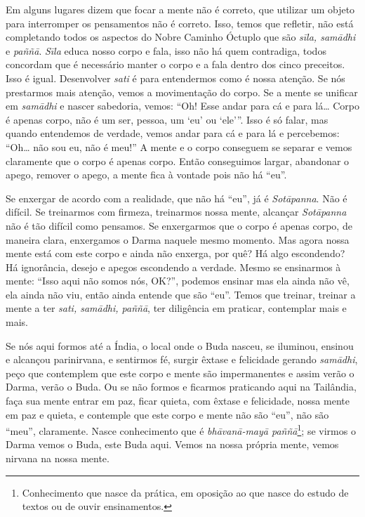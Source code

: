 Em alguns lugares dizem que focar a mente não é correto, que
utilizar um objeto para interromper os pensamentos não é correto. Isso,
temos que refletir, não está completando todos os aspectos do Nobre
Caminho Óctuplo que são \textit{sīla, samādhi} e\textit{ paññā}.
\textit{Sīla} educa nosso corpo e fala, isso não há quem contradiga,
todos concordam que é necessário manter o corpo e a fala dentro dos
cinco preceitos. Isso é igual. Desenvolver \textit{sati} é para
entendermos como é nossa atenção. Se nós prestarmos mais atenção, vemos
a movimentação do corpo. Se a mente se unificar em \textit{samādhi} e
nascer sabedoria, vemos: “Oh! Esse andar para cá e para lá… Corpo é
apenas corpo, não é um ser, pessoa, um ‘eu’ ou ‘ele’”. Isso é só falar,
mas quando entendemos de verdade, vemos andar para cá e para lá e
percebemos: “Oh… não sou eu, não é meu!” A mente e o corpo conseguem se
separar e vemos claramente que o corpo é apenas corpo. Então
conseguimos largar, abandonar o apego, remover o apego, a mente fica à
vontade pois não há “eu”. 

Se enxergar de acordo com a realidade, que não há “eu”, já é
\textit{Sotāpanna}. Não é difícil. Se treinarmos com firmeza,
treinarmos nossa mente, alcançar \textit{Sotāpanna} não é tão difícil
como pensamos. Se enxergarmos que o corpo é apenas corpo, de maneira
clara, enxergamos o Darma naquele mesmo momento. Mas agora nossa mente
está com este corpo e ainda não enxerga, por quê? Há algo escondendo?
Há ignorância, desejo e apegos escondendo a verdade. Mesmo se
ensinarmos à mente: “Isso aqui não somos nós, OK?”, podemos ensinar mas
ela ainda não vê, ela ainda não viu, então ainda entende que são “eu”.
Temos que treinar, treinar a mente a ter \textit{sati, samādhi,
paññā}, ter diligência em praticar, contemplar mais e mais. 

Se nós aqui formos até a Índia, o local onde o Buda nasceu, se
iluminou, ensinou e alcançou parinirvana, e sentirmos fé, surgir êxtase
e felicidade gerando \textit{samādhi}, peço que contemplem que este
corpo e mente são impermanentes e assim verão o Darma, verão o Buda. Ou
se não formos e ficarmos praticando aqui na Tailândia, faça sua mente
entrar em paz, ficar quieta, com êxtase e felicidade, nossa mente em
paz e quieta, e contemple que este corpo e mente não são “eu”, não são
“meu”, claramente. Nasce conhecimento que é \textit{bhāvanā-mayā
paññā}\footnote{Conhecimento que nasce da prática, em oposição ao que
nasce do estudo de textos ou de ouvir ensinamentos.}; se virmos o Darma
vemos o Buda, este Buda aqui. Vemos na nossa própria mente, vemos
nirvana na nossa mente. 

